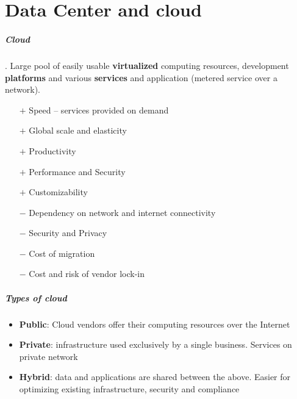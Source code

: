 \chapter{Data Center and cloud}

\paragraph{Cloud}. Large pool of easily usable \textbf{virtualized} computing
resources, development \textbf{platforms} and various \textbf{services} and
application (metered service over a network).
\begin{multicols}{2}
\begin{itemize}
\item[$+$] Speed – services provided on demand
\item[$+$] Global scale and elasticity
\item[$+$] Productivity
\item[$+$] Performance and Security
\item[$+$] Customizability
\item[$-$] Dependency on network and internet connectivity
\item[$-$] Security and Privacy
\item[$-$] Cost of migration
\item[$-$] Cost and risk of vendor lock-in
\end{itemize}
\end{multicols}

\paragraph{Types of cloud}
\begin{itemize}
\item \textbf{Public}: Cloud vendors offer their computing resources over the Internet
\item \textbf{Private}: infrastructure used exclusively by a single business. Services
  on private network
\item \textbf{Hybrid}: data and applications are shared between the above. Easier for
  optimizing existing infrastructure, security and compliance
\end{itemize}

